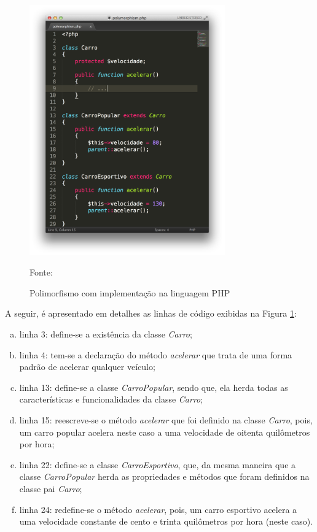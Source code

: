 \begin{figure}[h!tb]
	\caption{Polimorfismo com implementação na linguagem PHP}
	\label{fig:polimorfismo}

	\centering
	\includegraphics[width=0.75\textwidth]{images/polymorphism.png}

	\centering
	\footnotesize Fonte: \fonteOAutor
\end{figure}

\FloatBarrier 	%

A seguir, é apresentado em detalhes as linhas de código exibidas na Figura 
\ref{fig:polimorfismo}:

\begin{enumerate}[a)]
    \item linha 3: define-se a existência da classe \textit{Carro};
    \item linha 4: tem-se a declaração do método \textit{acelerar} que trata de
    uma forma padrão de acelerar qualquer veículo;
    \item linha 13: define-se a classe \textit{CarroPopular}, sendo que, ela
    herda todas as características e funcionalidades da classe \textit{Carro};
    \item linha 15: reescreve-se o método \textit{acelerar} que foi definido na
    classe \textit{Carro}, pois, um carro popular acelera neste caso a uma
    velocidade de oitenta quilômetros por hora;
    \item linha 22: define-se a classe \textit{CarroEsportivo}, que, da mesma
    maneira que a classe \textit{CarroPopular} herda as propriedades e métodos
    que foram definidos na classe pai \textit{Carro};
    \item linha 24: redefine-se o método \textit{acelerar}, pois, um carro
    esportivo acelera a uma velocidade constante de cento e trinta quilômetros
    por hora (neste caso).
\end{enumerate}

